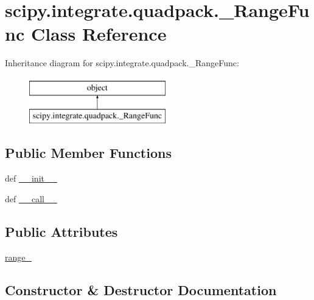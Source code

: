 \hypertarget{classscipy_1_1integrate_1_1quadpack_1_1__RangeFunc}{}\section{scipy.\+integrate.\+quadpack.\+\_\+\+Range\+Func Class Reference}
\label{classscipy_1_1integrate_1_1quadpack_1_1__RangeFunc}
Inheritance diagram for scipy.\+integrate.\+quadpack.\+\_\+\+Range\+Func\+:\begin{figure}[H]
\begin{center}
\leavevmode
\includegraphics[height=2.000000cm]{classscipy_1_1integrate_1_1quadpack_1_1__RangeFunc}
\end{center}
\end{figure}
\subsection*{Public Member Functions}
\begin{DoxyCompactItemize}
\item 
def \hyperlink{classscipy_1_1integrate_1_1quadpack_1_1__RangeFunc_aadf95cc4815e7f3649557e26c1f5594d}{\+\_\+\+\_\+init\+\_\+\+\_\+}
\item 
def \hyperlink{classscipy_1_1integrate_1_1quadpack_1_1__RangeFunc_ae57966caa6af111b2684cfb4749ce3d9}{\+\_\+\+\_\+call\+\_\+\+\_\+}
\end{DoxyCompactItemize}
\subsection*{Public Attributes}
\begin{DoxyCompactItemize}
\item 
\hyperlink{classscipy_1_1integrate_1_1quadpack_1_1__RangeFunc_a975c32a47889c61cdce4d477d2118908}{range\+\_\+}
\end{DoxyCompactItemize}


\subsection{Constructor \& Destructor Documentation}
\hypertarget{classscipy_1_1integrate_1_1quadpack_1_1__RangeFunc_aadf95cc4815e7f3649557e26c1f5594d}{}
